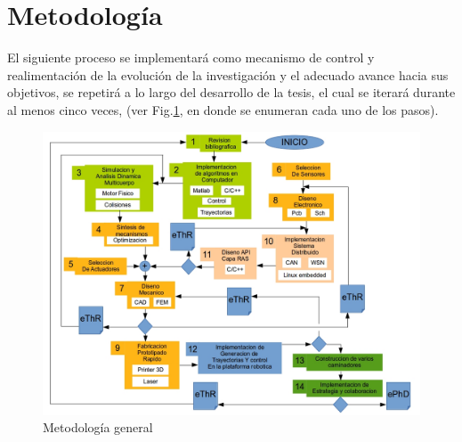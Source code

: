\section[Metodolog\'ia]{Metodolog\'ia}
\label{sec:metodo}

El siguiente proceso se implementar\'a como mecanismo de control y realimentación de la evoluci\'on de la investigaci\'on y el adecuado avance hacia sus objetivos, se repetir\'a a lo largo del desarrollo de la tesis, el cual se iterar\'a durante al menos cinco veces, (ver Fig.\ref{fig:method}, en donde se enumeran cada uno de los pasos).
\begin{figure}[!htb]
  \centering
  \includegraphics[scale=0.42]{../images/metGen2.png}
  \caption{Metodolog\'ia general}
  \label{fig:method}
\end{figure}
